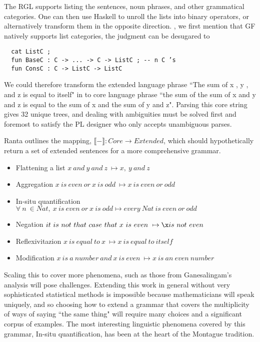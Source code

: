 The RGL supports listing the sentences, noun phrases, and other grammatical
categories. One can then use Haskell to unroll the lists into binary operators, or
alternatively transform them in the opposite direction. , we first mention that
GF natively supports list categories, the judgment  can be
desugared to

\begin{verbatim}
  cat ListC ;
  fun BaseC : C -> ... -> C -> ListC ; -- n C ’s
  fun ConsC : C -> ListC -> ListC
\end{verbatim}

We could therefore transform the extended language phrase ``The sum of x , y ,
and z is equal to itself" in to core language phrase ``the sum of the sum of x
and y and z is equal to the sum of x and the sum of y and z". Parsing this core
string gives 32 unique trees, and dealing with ambiguities must be solved first
and foremost to satisfy the PL designer who only accepts unambiguous parses.

Ranta outlines the mapping, $\llbracket - \rrbracket : Core \to Extended$,
which should hypothetically return a set of extended sentences for a more
comprehensive grammar.

\begin{itemize}
\item Flattening a list
  $x\ and\ y\ and\ z\ \mapsto x,\ y\ and\ z$
\item Aggregation
  $x\ is\ even\ or\ x\ is\ odd\ \mapsto x\ is\ even\ or\ odd$
\item In-situ quantification \\
  $\forall\ n\ \in Nat,\ x\ is\ even\ or\ x\ is\ odd \mapsto every\ Nat\ is\ even\ or\ odd$
\item Negation
  $it\ is\ not\ that\ case\ that\ x\ is\ even\ \mapsto \x is\ not\ even$
\item Reflexivitazion
  $x\ is\ equal\ to\ x\ \mapsto x\ is\ equal\ to\ itself$
\item Modification
  $x\ is\ a\ number\ and\ x\ is\ even\ \mapsto x\ is\ an\ even\ number$
\end{itemize}

Scaling this to cover more phenomena, such as those from Ganesalingam's analysis
will pose challenges. Extending this work in general without very sophisticated
statistical methods is impossible because mathematicians will speak uniquely,
and so choosing how to extend a grammar that covers the multiplicity of ways of
saying ``the same thing" will require many choices and a significant corpus of
examples. The most interesting linguistic phenomena covered by this grammar,
In-situ quantification, has been at the heart of the Montague tradition.

